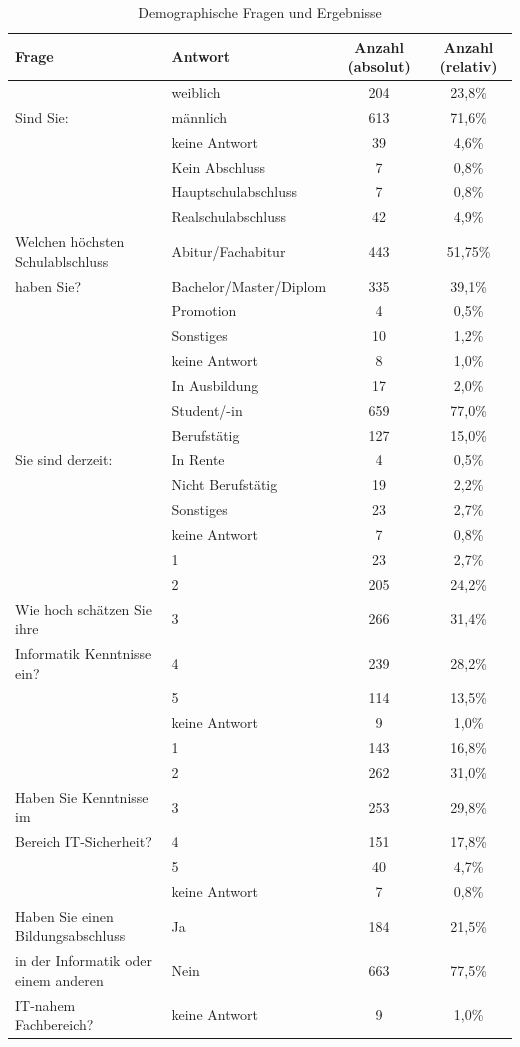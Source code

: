 \begin{table}
	\begin{tabular}[]{ l | l | c | c }
	\hline
	Frage & Antwort & Anzahl (absolut) & Anzahl (relativ) \\
	\hline
	& weiblich &  204 & 23,8\% \\
	Sind Sie:& männlich & 613 & 71,6\% \\
	& keine Antwort & 39 & 4,6\% \\
	\hline \hline
	& Kein Abschluss & 7 & 0,8\% \\
	& Hauptschulabschluss & 7 & 0,8\% \\
	& Realschulabschluss & 42 & 4,9\% \\
	Welchen höchsten Schulablschluss& Abitur/Fachabitur & 443 & 51,75\% \\
	haben Sie? & Bachelor/Master/Diplom & 335 & 39,1\% \\
	& Promotion & 4 & 0,5\% \\
	& Sonstiges & 10 & 1,2\% \\
	& keine Antwort & 8 & 1,0\% \\
	\hline \hline
	& In Ausbildung & 17 & 2,0\% \\
	& Student/-in & 659 & 77,0\% \\
	& Berufstätig & 127 & 15,0\%\\
	Sie sind derzeit: & In Rente & 4 & 0,5\% \\
	& Nicht Berufstätig & 19 & 2,2\% \\
	& Sonstiges & 23 & 2,7\% \\
	& keine Antwort & 7 & 0,8\% \\
	\hline \hline
	& 1 & 23 & 2,7\%\\
	& 2 & 205 & 24,2\% \\
	Wie hoch schätzen Sie ihre & 3 & 266 & 31,4\% \\
	Informatik Kenntnisse ein? & 4 & 239 & 28,2\% \\
	& 5 & 114 & 13,5\% \\
	& keine Antwort & 9 & 1,0\% \\
	\hline \hline
	& 1 & 143 & 16,8\% \\
	& 2 & 262 & 31,0\% \\
	Haben Sie Kenntnisse im& 3 & 253 & 29,8\% \\
	Bereich IT-Sicherheit?& 4 & 151 & 17,8\% \\
	& 5 & 40 & 4,7\% \\
	& keine Antwort & 7 & 0,8\% \\
	\hline \hline
	Haben Sie einen Bildungsabschluss & Ja & 184 & 21,5\% \\
	in der Informatik oder einem anderen & Nein & 663 & 77,5\%\\
	IT-nahem Fachbereich? & keine Antwort & 9 & 1,0\% \\
	\hline
	\end{tabular}
	\caption{Demographische Fragen und Ergebnisse}\label{demoqna}
\end{table}

